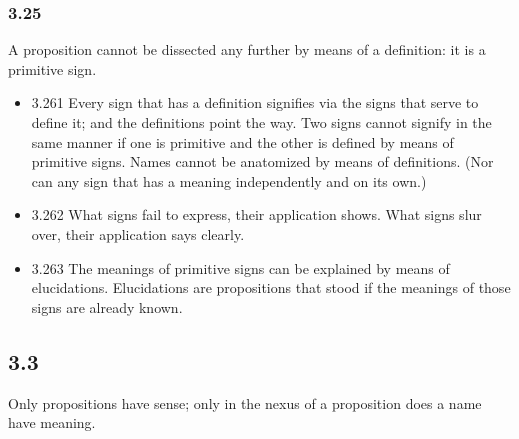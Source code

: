 \documentclass[11pt]{article}
\begin{document}
\subsubsection*{3.25}
\label{sec:org53d2528}
A proposition cannot be dissected any further by means of a
definition: it is a primitive sign.
\begin{itemize}
\item 3.261
\label{sec:org2876b70}
Every sign that has a definition signifies via the signs that serve
to define it; and the definitions point the way. Two signs cannot signify
in the same manner if one is primitive and the other is defined by means of
primitive signs. Names cannot be anatomized by means of definitions. (Nor
can any sign that has a meaning independently and on its own.)
\item 3.262
\label{sec:org0dc7dc2}
What signs fail to express, their application shows. What signs slur
over, their application says clearly.
\item 3.263
\label{sec:orgea53731}
The meanings of primitive signs can be explained by means of
elucidations. Elucidations are propositions that stood if the meanings of
those signs are already known.
\end{itemize}
\subsection*{3.3}
\label{sec:orgd231657}
Only propositions have sense; only in the nexus of a proposition does a
name have meaning.
\end{document}

